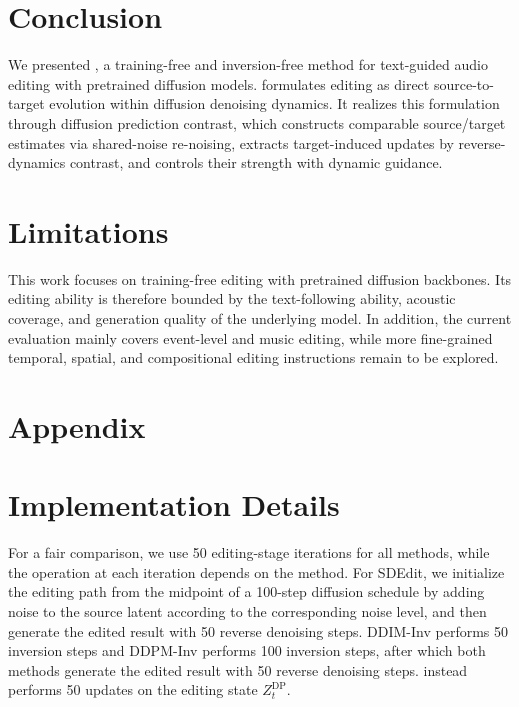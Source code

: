 \section{Conclusion}

We presented \ourmethod{}, a training-free and inversion-free method for text-guided audio editing with pretrained diffusion models.
\ourmethod{} formulates editing as direct source-to-target evolution within diffusion denoising dynamics.
It realizes this formulation through diffusion prediction contrast, which constructs comparable source/target estimates via shared-noise re-noising, extracts target-induced updates by reverse-dynamics contrast, and controls their strength with dynamic guidance.

\section*{Limitations}

This work focuses on training-free editing with pretrained diffusion backbones. Its editing ability is therefore bounded by the text-following ability, acoustic coverage, and generation quality of the underlying model. In addition, the current evaluation mainly covers event-level and music editing, while more fine-grained temporal, spatial, and compositional editing instructions remain to be explored.

\appendix

\section*{Appendix}

\section{Implementation Details}
\label{app:implementation_details}

For a fair comparison, we use 50 editing-stage iterations for all methods, while the operation at each iteration depends on the method.
For SDEdit, we initialize the editing path from the midpoint of a 100-step diffusion schedule by adding noise to the source latent according to the corresponding noise level, and then generate the edited result with 50 reverse denoising steps.
DDIM-Inv performs 50 inversion steps and DDPM-Inv performs 100 inversion steps, after which both methods generate the edited result with 50 reverse denoising steps.
\ourmethod{} instead performs 50 updates on the editing state $Z_t^{\text{DP}}$.

